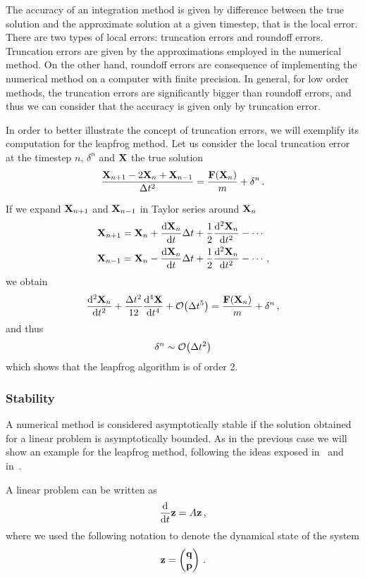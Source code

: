 \documentclass[class=report, crop=false]{standalone}
\begin{document}
The accuracy of an integration method is given by difference between the true
solution and the approximate solution at a given timestep, that is the local
error. There are two types of local errors: truncation errors and roundoff errors.
Truncation errors are given by the approximations employed in the numerical method.
On the other hand, roundoff errors are consequence of implementing the numerical
method on a computer with finite precision. In general, for low order methods,
the truncation errors are significantly bigger than roundoff errors, and thus
we can consider that the accuracy is given only by truncation error.

In order to better illustrate the concept of truncation errors, we will exemplify
its computation for the leapfrog method. Let us consider the local truncation
error at the timestep \(n\), \(\delta^n\) and \(\vb{X}\) the true solution
\[
  \frac{\vb{X}_{n+1}-2\vb{X}_n+\vb{X}_{n-1}}{\Delta t^2} = \frac{\vb{F}(\vb{X}_n)}{m} + \delta^n\,.
\]

If we expand \(\vb{X}_{n+1}\) and \(\vb{X}_{n-1}\) in Taylor series around \(\vb{X}_n\)
\begin{align*}
  \vb{X}_{n+1} &= \vb{X}_n + \dv{\vb{X}_n}{t}\Delta t + \frac{1}{2} \dv[2]{\vb{X}_n}{t} - \dotsb \\
  \vb{X}_{n-1} &= \vb{X}_n - \dv{\vb{X}_n}{t}\Delta t + \frac{1}{2} \dv[2]{\vb{X}_n}{t} - \dotsb\,,
\end{align*}
we obtain
\[
  \dv[2]{\vb{X}_n}{t} + \frac{\Delta t^2}{12} \dv[4]{\vb{X}}{t} + \order{\Delta t^5}
  = \frac{\vb{F}(\vb{X}_n)}{m} + \delta^n\,,
\]
and thus
\[
  \delta^n \sim \order{\Delta t^2}
\]
which shows that the leapfrog algorithm is of order 2.

\subsubsection{Stability}

A numerical method is considered asymptotically stable if the solution obtained
for a linear problem is asymptotically bounded.
As in the previous case we will show an example for the leapfrog method,
following the ideas exposed in~\cite{butcher_numericalmethods_2016}
and in~\textcite[Section 2.6]{leimkuhler_simulatinghamiltonian_2004}.

A linear problem can be written as
\[
\dv{t} \vb{z} = A \vb{z}\,,
\]
where we used the following notation to denote the dynamical state of the system
\[
\vb{z} =
\begin{pmatrix}
  \vb{q} \\
  \vb{p}
\end{pmatrix}\,.
\]
\end{document}
